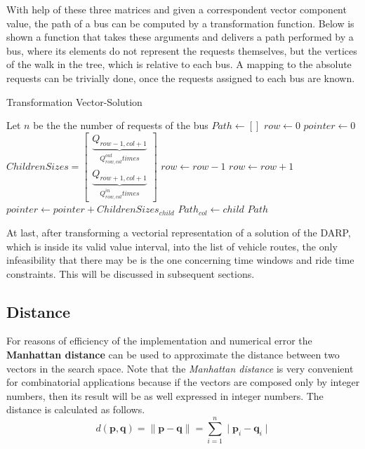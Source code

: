 \documentclass[tuberlin,cic,tc,openright,english,noabntcite,oneside]{iiufrgs}
\begin{document}
With help of these three matrices and given a correspondent vector component value, the path of a bus can be computed by a transformation function. Below is shown a function that takes these arguments and delivers a path performed by a bus, where its elements do not represent the requests themselves, but the vertices of the walk in the tree, which is relative to each bus. A mapping to the absolute requests can be trivially done, once the requests assigned to each bus are known.
\begin{algorithm}[H]
\caption{Transformation Vector-Solution}
\begin{algorithmic}
\State Let $n$ be the the number of requests of the bus
\State $Path \gets [ ]$
\State $row \gets 0$
\State $pointer \gets 0$
	\State $\displaystyle ChildrenSizes = \begin{bmatrix}\underbrace{Q_{row-1,col+1}}_{Q^{out}_{row,col} times}
			\\ \underbrace{Q_{row+1,col+1}}_{Q^{in}_{row,col} times}\end{bmatrix}$
				\State $row \gets row - 1$
			\Else
				\State $row \gets row + 1$
			\EndIf
		\Else
			\State $pointer \gets pointer + ChildrenSizes_{child}$
		\EndIf
	\EndFor
	\State $Path_{col} \gets child$
\EndFor
\State \Return $Path$
\EndFunction
\end{algorithmic}
\end{algorithm}

At last, after transforming a vectorial representation of a solution of the DARP, which is inside its valid value interval, into the list of vehicle routes, the only infeasibility that there may be is the one concerning time windows and ride time constraints. This will be discussed in subsequent sections.

\subsection{Distance}
For reasons of efficiency of the implementation and numerical error the \textbf{Manhattan distance} can be used to approximate the distance between two vectors in the search space. Note that the \emph{Manhattan distance} is very convenient for combinatorial applications because if the vectors are composed only by integer numbers, then its result will be as well expressed in integer numbers. The distance is calculated as follows.
$$d(\mathbf{p},\mathbf{q}) = \parallel \mathbf{p} - \mathbf{q} \parallel = \sum_{i=1}^{n} \mid \mathbf{p}_{i}-\mathbf{q}_{i} \mid$$
\end{document}
